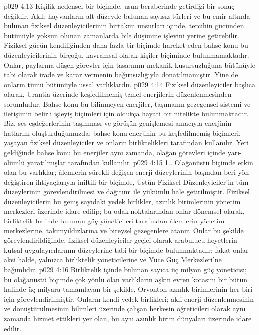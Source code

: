 \vs p029 4:13 Kişilik nedensel bir biçimde, usun beraberinde getirdiği bir sonuç değildir. Akıl; hayvanların alt düzeyde bulunan sayısız türleri ve bu emir altında bulunan fiziksel düzenleyicilerinin birtakım unsurları içinde, tercihin gücünden bütünüyle yoksun olunan zamanlarda bile düşünme işlevini yerine getirebilir. Fiziksel gücün kendiliğinden daha fazla bir biçimde hareket eden bahse konu bu düzenleyicilerinin birçoğu, kavramsal olarak kişiler biçiminde bulunmamaktadır. Onlar, paylarına düşen görevler için tasarımın mekanik kusursuzluğuna bütünüyle tabi olarak irade ve karar vermenin bağımsızlığıyla donatılmamıştır. Yine de onların tümü bütünüyle ussal varlıklardır.
\vs p029 4:14 Fiziksel düzenleyiciler başlıca olarak, Urantia üzerinde keşfedilmemiş temel enerjilerin düzenlenmesinden sorumludur. Bahse konu bu bilinmeyen enerjiler, taşımanın gezegensel sistemi ve iletişimin belirli işleyiş biçimleri için oldukça hayati bir nitelikte bulunmaktadır. Biz, ses eşdeğerlerinin taşınması ve görüşün genişlemesi amacıyla enerjinin hatlarını oluşturduğumuzda; bahse konu enerjinin bu keşfedilmemiş biçimleri, yaşayan fiziksel düzenleyiciler ve onların birliktelikleri tarafından kullanılır. Yeri geldiğinde bahse konu bu enerjiler aynı zamanda, olağan görevleri içinde yarı\hyp{}ölümlü yaratılmışlar tarafından kullanılır.
\vs p029 4:15 1.\bibnobreakspace {}. Olağanüstü biçimde etkin olan bu varlıklar; âlemlerin sürekli değişen enerji düzeylerinin başından beri yön değiştiren ihtiyaçlarıyla iniltili bir biçimde, Üstün Fiziksel Düzenleyiciler’in tüm düzeylerinin görevlendirilmesi ve dağıtımı ile yükümlü hale getirilmiştir. Fiziksel düzenleyicilerin bu geniş sayıdaki yedek birlikler, azınlık birimlerinin yönetim merkezleri üzerinde idare edilip; bu odak noktalarından onlar dönemsel olarak, birliktelik halinde bulunan güç yöneticileri tarafından âlemlerin yönetim merkezlerine, takımyıldızlarına ve bireysel gezegenlere atanır. Onlar bu şekilde görevlendirildiğinde, fiziksel düzenleyiciler geçici olarak arabulucu heyetlerin kutsal uygulayıcılarının düzeylerine tabi bir biçimde bulunmaktadır; fakat onlar aksi halde, yalnızca birliktelik yöneticilerine ve Yüce Güç Merkezleri’ne bağımlıdır.
\vs p029 4:16 Birliktelik içinde bulunan sayıca üç milyon güç yöneticisi; bu olağanüstü biçimde çok yönlü olan varlıkların aşkın evren kotasını bir bütün halinde üç milyara tamamlayan bir şekilde, Orvonton azınlık birimlerinin her biri için görevlendirilmiştir. Onların kendi yedek birlikleri; akli enerji düzenlenmesinin ve dönüştürülmesinin bilimleri üzerinde çalışan herkesin öğreticileri olarak aynı zamanda hizmet ettikleri yer olan, bu aynı azınlık birim dünyaları üzerinde idare edilir.
